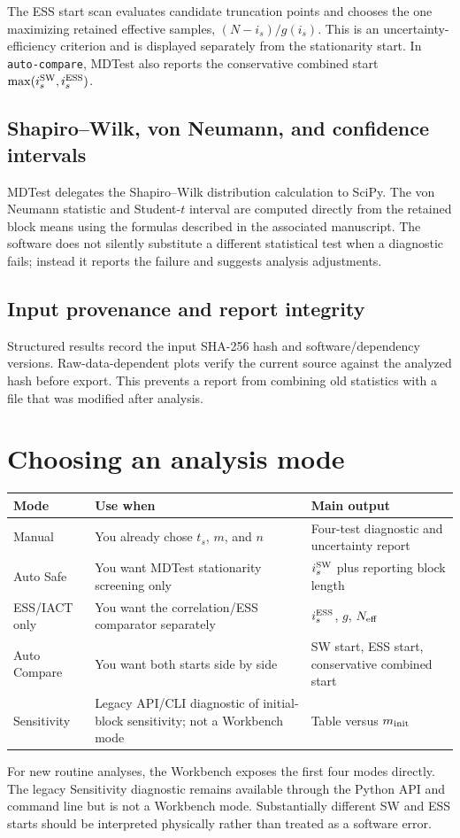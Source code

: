 \documentclass[11pt,oneside]{report}
\newcommand{\is}{i_s}
\begin{document}
The ESS start scan evaluates candidate truncation points and chooses the one maximizing retained effective samples, $(N-\is)/g(\is)$. This is an uncertainty-efficiency criterion and is displayed separately from the stationarity start. In \texttt{auto-compare}, MDTest also reports the conservative combined start $\max(\is^{\rm SW},\is^{\rm ESS})$.

\section{Shapiro--Wilk, von Neumann, and confidence intervals}
MDTest delegates the Shapiro--Wilk distribution calculation to SciPy. The von Neumann statistic and Student-$t$ interval are computed directly from the retained block means using the formulas described in the associated manuscript. The software does not silently substitute a different statistical test when a diagnostic fails; instead it reports the failure and suggests analysis adjustments.

\section{Input provenance and report integrity}
Structured results record the input SHA-256 hash and software/dependency versions. Raw-data-dependent plots verify the current source against the analyzed hash before export. This prevents a report from combining old statistics with a file that was modified after analysis.

\chapter{Choosing an analysis mode}
\begin{table}[h]
\centering
\begin{tabularx}{\textwidth}{lYY}
\toprule
Mode & Use when & Main output\\
\midrule
Manual & You already chose $t_s$, $m$, and $n$ & Four-test diagnostic and uncertainty report\\
Auto Safe & You want MDTest stationarity screening only & $i_s^{\rm SW}$ plus reporting block length\\
ESS/IACT only & You want the correlation/ESS comparator separately & $i_s^{\rm ESS}$, $g$, $N_{\rm eff}$\\
Auto Compare & You want both starts side by side & SW start, ESS start, conservative combined start\\
Sensitivity & Legacy API/CLI diagnostic of initial-block sensitivity; not a Workbench mode & Table versus $m_{\rm init}$\\
\bottomrule
\end{tabularx}
\end{table}
For new routine analyses, the Workbench exposes the first four modes directly.  The legacy Sensitivity diagnostic remains available through the Python API and command line but is not a Workbench mode. Substantially different SW and ESS starts should be interpreted physically rather than treated as a software error.
\end{document}
